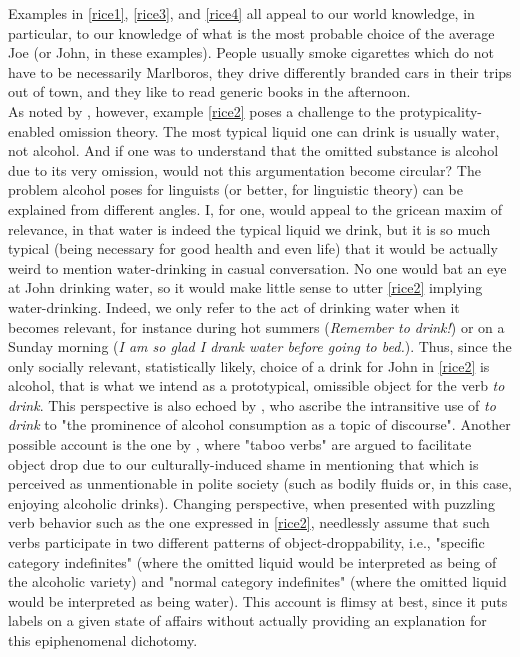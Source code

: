 Examples in \ref{rice1}, \ref{rice3}, and \ref{rice4} all appeal to our world knowledge, in particular, to our knowledge of what is the most probable choice of the average Joe (or John, in these examples). People usually smoke cigarettes which do not have to be necessarily Marlboros, they drive differently branded cars in their trips out of town, and they like to read generic books in the afternoon.\\
As noted by \textcite[125]{Naess2007}, however, example \ref{rice2} poses a challenge to the protypicality-enabled omission theory. The most typical liquid one can drink is usually water, not alcohol. And if one was to understand that the omitted substance is alcohol due to its very omission, would not this argumentation become circular? The problem alcohol poses for linguists (or better, for linguistic theory) can be explained from different angles. I, for one, would appeal to the gricean maxim of relevance, in that water is indeed the typical liquid we drink, but it is so much typical (being necessary for good health and even life) that it would be actually weird to mention water-drinking in casual conversation. No one would bat an eye at John drinking water, so it would make little sense to utter \ref{rice2} implying water-drinking. Indeed, we only refer to the act of drinking water when it becomes relevant, for instance during hot summers (\textit{Remember to drink!}) or on a Sunday morning (\textit{I am so glad I drank water before going to bed.}). Thus, since the only socially relevant, statistically likely, choice of a drink for John in \ref{rice2} is alcohol, that is what we intend as a prototypical, omissible object for the verb \textit{to drink}. This perspective is also echoed by \textcite[14]{NewmanRice2006}, who ascribe the intransitive use of \textit{to drink} to "the prominence of alcohol consumption as a topic of discourse". Another possible account is the one by \textcite[21-28]{Goldberg2005}, where "taboo verbs" are argued to facilitate object drop due to our culturally-induced shame in mentioning that which is perceived as unmentionable in polite society (such as bodily fluids or, in this case, enjoying alcoholic drinks).  Changing perspective, when presented with puzzling verb behavior such as the one expressed in \ref{rice2}, \textcite[303-305]{HuddlestonEtAl2002} needlessly assume that such verbs participate in two different patterns of object-droppability, i.e., "specific category indefinites" (where the omitted liquid would be interpreted as being of the alcoholic variety) and "normal category indefinites" (where the omitted liquid would be interpreted as being water). This account is flimsy at best, since it puts labels on a given state of affairs without actually providing an explanation for this epiphenomenal dichotomy. 